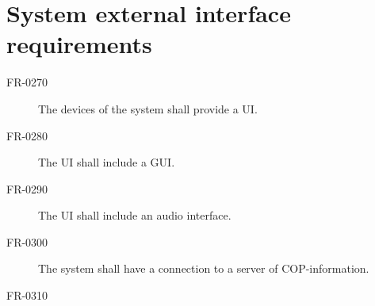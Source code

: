 \section{System external interface requirements}

\begin{description}
  \item[FR-0270] The devices of the system shall provide a UI. %
  \item[FR-0280] The UI shall include a GUI.
  \item[FR-0290] The UI shall include an audio interface.
  \item[FR-0300] The system shall have a connection to a server of COP-information.

  \item[FR-0310] 
  


\end{description}